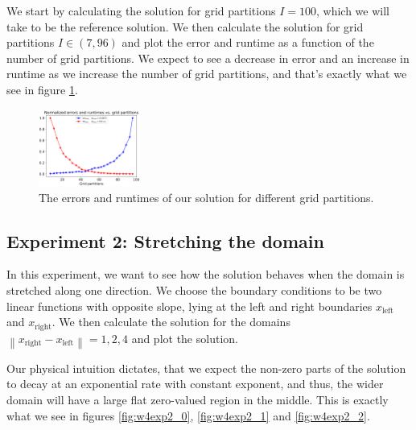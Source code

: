 \documentclass[acmtog]{acmart}
\begin{document}
We start by calculating the solution for grid partitions $I = 100$, which we will take to be the reference solution. We then calculate the solution for grid partitions $I \in (7, 96)$ and plot the error and runtime as a function of the number of grid partitions. We expect to see a decrease in error and an increase in runtime as we increase the number of grid partitions, and that's exactly what we see in figure \ref{fig:w4exp1}.

\graphicspath{{Images/Week4/exp1/}}
\begin{figure}[t]
  \centering
  \includegraphics[width = 0.3\textwidth]{Normalized_errors_runtimes_vs_grid_partitions.png}
  \caption{The errors and runtimes of our solution for different grid partitions.\label{fig:w4exp1}}
\end{figure}

\subsection{Experiment 2: Stretching the domain}
In this experiment, we want to see how the solution behaves when the domain is stretched along one direction. We choose the boundary conditions to be two linear functions with opposite slope, lying at the left and right boundaries $x_\mathrm{left}$ and $x_\mathrm{right}$. We then calculate the solution for the domains $\left\lVert x_\mathrm{right} - x_\mathrm{left} \right\rVert  = 1, 2, 4$ and plot the solution.

Our physical intuition dictates, that we expect the non-zero parts of the solution to decay at an exponential rate with constant exponent, and thus, the wider domain will have a large flat zero-valued region in the middle. This is exactly what we see in figures \ref{fig:w4exp2_0}, \ref{fig:w4exp2_1} and \ref{fig:w4exp2_2}.
\end{document}
